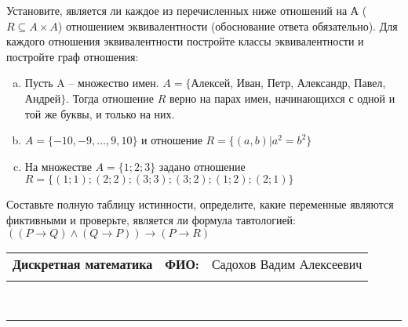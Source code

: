 \documentclass[10pt]{exam}
\newcommand{\class}{Дискретная математика}
\newcommand{\examdate}{}
\begin{document}
\begin{questions}
\question
Установите, является ли каждое из перечисленных ниже отношений на А ($R \subseteq A \times A$) отношением эквивалентности (обоснование ответа обязательно). Для каждого отношения эквивалентности постройте классы 
эквивалентности и постройте граф отношения:
\begin{enumerate} [a)]\setcounter{enumi}{0}
\item Пусть A – множество имен. $A = \{ $Алексей, Иван, Петр, Александр, Павел, Андрей$ \}$. Тогда отношение $R$ верно на парах имен, начинающихся с одной и той же буквы, и только на них.
\item $A = \{-10, -9, … , 9, 10\}$ и отношение $ R = \{(a,b)|a^{2} = b^{2}\}$
\item На множестве $A = \{1; 2; 3\}$ задано отношение $R = \{(1; 1); (2; 2); (3; 3); (3; 2); (1; 2); (2; 1)\}$
\end{enumerate}\question Составьте полную таблицу истинности, определите, какие переменные являются фиктивными и проверьте, является ли формула тавтологией:
$(( P \rightarrow Q) \land (Q \rightarrow P)) \rightarrow (P \rightarrow R)$

\end{questions}
\newpage
\begin{flushright}
\begin{tabular}{p{2.8in} r l}
\textbf{\class} & \textbf{ФИО:} &Садохов Вадим Алексеевич
\\

\textbf{\examdate} &&\\
\end{tabular}\\
\end{flushright}
\rule[1ex]{\textwidth}{.1pt}
\end{document}

